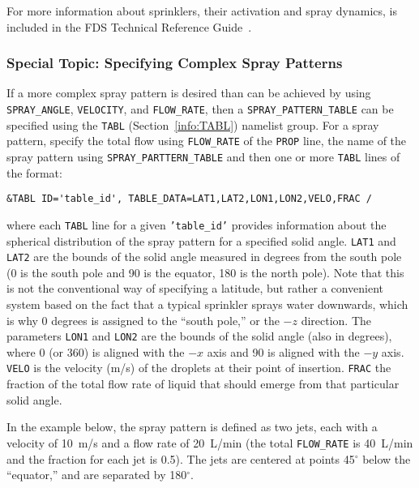 \documentclass[11pt]{book}
\newcommand{\ct}{\tt\small}
\begin{document}
\noindent
For more information about sprinklers, their activation and spray dynamics, is included in the FDS
Technical Reference Guide~\cite{FDS_Tech_Guide_5}.

\subsubsection{Special Topic: Specifying Complex Spray Patterns}
\label{info:spraypattern}

If a more complex spray pattern is desired than can be achieved by using {\ct SPRAY\_ANGLE}, {\ct VELOCITY},
and {\ct FLOW\_RATE}, then a {\ct SPRAY\_PATTERN\_TABLE} can be specified using the {\ct TABL} (Section~\ref{info:TABL})
namelist group.  For a spray pattern, specify the total flow using {\ct FLOW\_RATE} of the {\ct PROP} line, the name of the spray pattern using
{\ct SPRAY\_PARTTERN\_TABLE} and then one or more {\ct TABL} lines of the format:

\footnotesize
\begin{verbatim}
&TABL ID='table_id', TABLE_DATA=LAT1,LAT2,LON1,LON2,VELO,FRAC /
\end{verbatim} \normalsize

\noindent
where each {\ct TABL} line for a given {\ct 'table\_id'} provides information about the spherical distribution of the spray pattern
for a specified solid angle. {\ct LAT1} and {\ct LAT2} are the bounds of the solid angle measured in degrees from
the south pole (0 is the south pole and 90 is the equator, 180 is the north pole).  Note that this is not the conventional way of
specifying a latitude, but rather a convenient system based on the fact that a typical sprinkler sprays water downwards, which is
why 0 degrees is assigned to the ``south pole,'' or the $-z$ direction. The parameters {\ct LON1} and {\ct LON2} are the
bounds of the solid angle (also in degrees),
where 0 (or 360) is aligned with the $-x$ axis and 90 is aligned with the $-y$ axis.  {\ct VELO} is the velocity (m/s) of the droplets at their
point of insertion.
{\ct FRAC} the fraction of the total flow rate of liquid that should emerge from that particular solid angle.

In the example below, the spray pattern is defined as two jets, each with a velocity of 10~m/s and a flow rate
of 20~L/min (the total {\ct FLOW\_RATE} is 40~L/min and the fraction for each jet is 0.5). The jets are centered at points 45$^\circ$ below the ``equator,'' and are separated
by 180$^\circ$.
\end{document}
